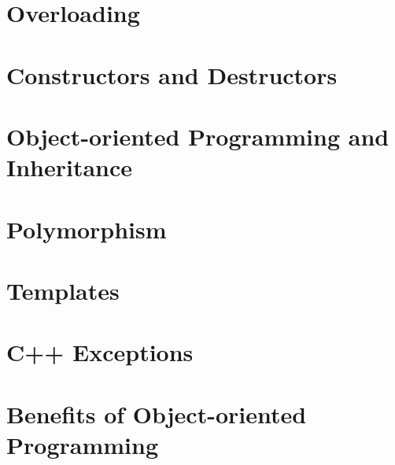 \documentclass{article}
\begin{document}
\section{Overloading}
\section{Constructors and Destructors}
\section{Object-oriented Programming and Inheritance}
\section{Polymorphism}
\section{Templates}
\section{C++ Exceptions}
\section{Benefits of Object-oriented Programming}
\end{document}
